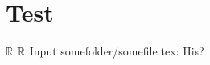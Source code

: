 \documentclass{article}
\begin{document}
\section*{Test}
    $\mathbb{R}$
    $\mathbb{R}$
    Input somefolder/somefile.tex:
    His?
\end{document}
